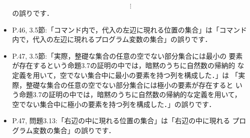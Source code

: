 \documentclass[12pt,titlepage,twoside,openright,dvipdfmx]{jsbook}
\theoremstyle{definition}
\begin{document}
\begin{itemize}
\[{      {\vdots}
    }
  \]
  の誤りです．
\item P.46, 3.5節:「コマンド内で，代入の左辺に現れる位置の集合」は「コマンド内で，代入の左辺に現れるプログラム変数の集合」の誤りです．
\item P.47, 3.5節:「実際，整礎な集合の任意の空でない部分集合には最小の
  要素が存在するという命題3.7の証明の中では，暗黙のうちに自然数の帰納的
  な定義を用いて，空でない集合中に最小の要素を持つ列を構成した．」は
  「実際，整礎な集合の任意の空でない部分集合には極小の要素が存在すると
  いう命題3.7の証明の中では，暗黙のうちに自然数の帰納的な定義を用いて，
  空でない集合中に極小の要素を持つ列を構成した．」の誤りです．
\item P.47, 問題3.13:「右辺の中に現れる位置の集合」は「右辺の中に現れる
  プログラム変数の集合」の誤りです．
\end{itemize}

\end{document}
